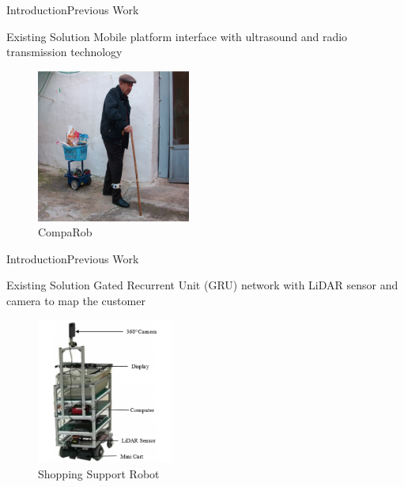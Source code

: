 \documentclass{beamer}
\begin{document}

\begin{frame}{Introduction}{Previous Work}
  \begin{block}{Existing Solution}
        Mobile platform interface with ultrasound and radio transmission technology~\cite{Sales2016-CompaRob}
  \end{block}
    \begin{figure}[b]
        \centering
        \includegraphics[width=0.45\textwidth]{figs/img/CompaRob}
        \caption{CompaRob}
    \end{figure}
\end{frame}


\begin{frame}{Introduction}{Previous Work}
  \begin{block}{Existing Solution}
        Gated Recurrent Unit (GRU) network with LiDAR sensor and camera to map the customer~\cite{islam_lam_fukuda_kobayashi_kuno_2019}
  \end{block}
    \begin{figure}[b]
        \centering
        \includegraphics[width=0.40\textwidth]{figs/img/ShoppingSuportRobot}
        \caption{Shopping Support Robot}
    \end{figure}
\end{frame}
\end{document}
